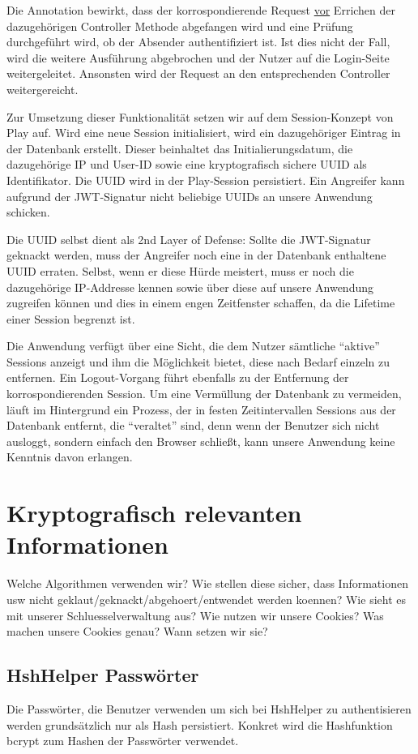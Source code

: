 \documentclass[12pt,DIV14,BCOR10mm,a4paper,twoside,parskip=half-,headsepline,headinclude,english,ngerman,bibliography=totocnumbered]{scrreprt}
\begin{document}
Die Annotation bewirkt, dass der korrospondierende Request \underline{vor} Errichen der dazugehörigen Controller Methode abgefangen wird und eine Prüfung durchgeführt wird, ob der Absender authentifiziert ist. Ist dies nicht der Fall, wird die weitere Ausführung abgebrochen und der Nutzer auf die Login-Seite weitergeleitet. Ansonsten wird der Request an den entsprechenden Controller weitergereicht.

Zur Umsetzung dieser Funktionalität setzen wir auf dem Session-Konzept von Play auf. Wird eine neue Session initialisiert, wird ein dazugehöriger Eintrag in der Datenbank erstellt. Dieser beinhaltet das Initialierungsdatum, die dazugehörige IP und User-ID sowie eine kryptografisch sichere UUID als Identifikator. Die UUID wird in der Play-Session persistiert. Ein Angreifer kann aufgrund der JWT-Signatur nicht beliebige UUIDs an unsere Anwendung schicken.

Die UUID selbst dient als 2nd Layer of Defense: Sollte die JWT-Signatur geknackt werden, muss der Angreifer noch eine in der Datenbank enthaltene UUID erraten. Selbst, wenn er diese Hürde meistert, muss er noch die dazugehörige IP-Addresse kennen sowie über diese auf unsere Anwendung zugreifen können und dies in einem engen Zeitfenster schaffen, da die Lifetime einer Session begrenzt ist.

Die Anwendung verfügt über eine Sicht, die dem Nutzer sämtliche ``aktive'' Sessions anzeigt und ihm die Möglichkeit bietet, diese nach Bedarf einzeln zu entfernen. Ein Logout-Vorgang führt ebenfalls zu der Entfernung der korrospondierenden Session. Um eine Vermüllung der Datenbank zu vermeiden, läuft im Hintergrund ein Prozess, der in festen Zeitintervallen Sessions aus der Datenbank entfernt, die ``veraltet'' sind, denn wenn der Benutzer sich nicht ausloggt, sondern einfach den Browser schließt, kann unsere Anwendung keine Kenntnis davon erlangen.

\section{Kryptografisch relevanten Informationen}

Welche Algorithmen verwenden wir?
Wie stellen diese sicher, dass Informationen usw nicht geklaut/geknackt/abgehoert/entwendet werden koennen?
Wie sieht es mit unserer Schluesselverwaltung aus?
Wie nutzen wir unsere Cookies? Was machen unsere Cookies genau?
Wann setzen wir sie?


\subsection{HshHelper Passwörter}
Die Passwörter, die Benutzer verwenden um sich bei HshHelper zu authentisieren werden grundsätzlich nur als Hash persistiert. Konkret wird die Hashfunktion bcrypt zum Hashen der Passwörter verwendet.
\end{document}
